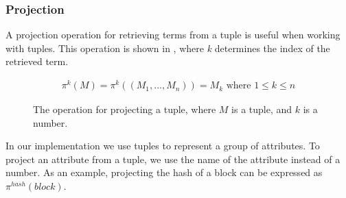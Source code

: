 \subsubsection{Projection}
A projection operation for retrieving terms from a tuple is useful when working with tuples. This operation is shown in , where \textit{k} determines the index of the retrieved term.
\begin{figure}[h]
    \begin{align*}
        \pi^k(M)=\pi^k((M_1,..., M_n))=M_k \text{ where } 1\leq k \leq n
    \end{align*}
    \caption{The operation for projecting a tuple, where $M$ is a tuple, and $k$ is a number.}
\label{tupleop}
\end{figure}

In our implementation we use tuples to represent a group of attributes. To project an attribute from a tuple, we use the name of the attribute instead of a number. As an example, projecting the hash of a block can be expressed as $\pi^{hash}(block)$.
\FloatBarrier